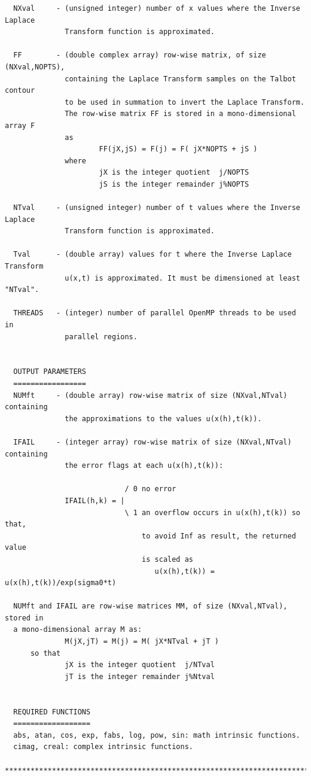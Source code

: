 \documentclass[a4paper,10pt]{report}%
\begin{document}
\begin{lstlisting}
  NXval     - (unsigned integer) number of x values where the Inverse Laplace
              Transform function is approximated.

  FF        - (double complex array) row-wise matrix, of size (NXval,NOPTS),
              containing the Laplace Transform samples on the Talbot contour
              to be used in summation to invert the Laplace Transform.
              The row-wise matrix FF is stored in a mono-dimensional array F
              as
                      FF(jX,jS) = F(j) = F( jX*NOPTS + jS )
              where
                      jX is the integer quotient  j/NOPTS
                      jS is the integer remainder j%NOPTS

  NTval     - (unsigned integer) number of t values where the Inverse Laplace
              Transform function is approximated.

  Tval      - (double array) values for t where the Inverse Laplace Transform
              u(x,t) is approximated. It must be dimensioned at least "NTval".

  THREADS   - (integer) number of parallel OpenMP threads to be used in
              parallel regions.


  OUTPUT PARAMETERS
  =================
  NUMft     - (double array) row-wise matrix of size (NXval,NTval) containing
              the approximations to the values u(x(h),t(k)).

  IFAIL     - (integer array) row-wise matrix of size (NXval,NTval) containing
              the error flags at each u(x(h),t(k)):

                            / 0 no error
              IFAIL(h,k) = |
                            \ 1 an overflow occurs in u(x(h),t(k)) so that,
                                to avoid Inf as result, the returned value
                                is scaled as
                                   u(x(h),t(k)) = u(x(h),t(k))/exp(sigma0*t)

  NUMft and IFAIL are row-wise matrices MM, of size (NXval,NTval), stored in
  a mono-dimensional array M as:
              M(jX,jT) = M(j) = M( jX*NTval + jT )
      so that
              jX is the integer quotient  j/NTval
              jT is the integer remainder j%Ntval


  REQUIRED FUNCTIONS
  ==================
  abs, atan, cos, exp, fabs, log, pow, sin: math intrinsic functions.
  cimag, creal: complex intrinsic functions.

*****************************************************************************\
\end{lstlisting}
\end{document}
